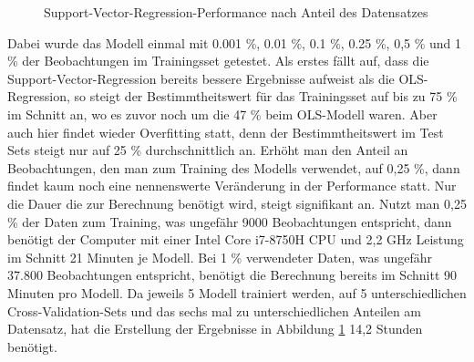 \documentclass[a4paper,12pt]{thesis}
\begin{document}
\begin{figure}%
	\centering
	\qquad
	\caption{Support-Vector-Regression-Performance nach Anteil des Datensatzes}%
	\label{fig:TrainingsShareValidation2}%
\end{figure}

Dabei wurde das Modell einmal mit 0.001 \%, 0.01 \%, 0.1 \%, 0.25 \%, 0,5 \% und 1 \% der Beobachtungen im Trainingsset getestet. Als erstes fällt auf, dass die Support-Vector-Regression bereits bessere Ergebnisse aufweist als die OLS-Regression, so steigt der Bestimmtheitswert für das Trainingsset auf bis zu 75 \% im Schnitt an, wo es zuvor noch um die 47 \% beim OLS-Modell waren. Aber auch hier findet wieder Overfitting statt, denn der Bestimmtheitswert im Test Sets steigt nur auf 25 \% durchschnittlich an. Erhöht man den Anteil an Beobachtungen, den man zum Training des Modells verwendet, auf 0,25 \%, dann findet kaum noch eine nennenswerte Veränderung in der Performance statt. Nur die Dauer die zur Berechnung benötigt wird, steigt signifikant an. Nutzt man 0,25 \% der Daten zum Training, was ungefähr 9000 Beobachtungen entspricht, dann benötigt der Computer mit einer Intel Core i7-8750H CPU und 2,2 GHz Leistung im Schnitt 21 Minuten je Modell. Bei 1 \% verwendeter Daten, was ungefähr 37.800 Beobachtungen entspricht, benötigt die Berechnung bereits im Schnitt 90 Minuten pro Modell. Da jeweils 5 Modell trainiert werden, auf 5 unterschiedlichen Cross-Validation-Sets und das sechs mal zu unterschiedlichen Anteilen am Datensatz, hat die Erstellung der Ergebnisse in Abbildung \ref{fig:TrainingsShareValidation2} 14,2 Stunden benötigt.
\end{document}
